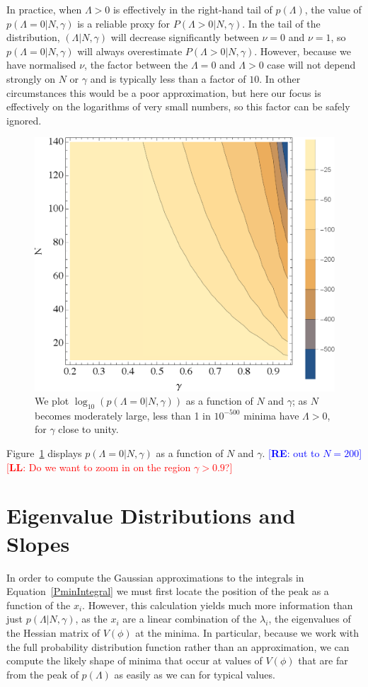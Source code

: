 \documentclass[12pt]{article}
\newcommand{\re}[1]{\textcolor{blue}{[{\bf RE}: #1]}}
\newcommand{\lfl}[1]{\textcolor{red}{[{\bf LL}: #1]}}
\begin{document}
In practice, when $\Lambda>0$ is effectively in the right-hand tail of $p(\Lambda)$,  the value of $p(\Lambda=0|N,\gamma)$ is a reliable proxy for $P(\Lambda>0|N,\gamma)$. In the tail of the distribution,  $(\Lambda|N,\gamma)$ will decrease significantly between $\nu=0$ and $\nu=1$, so $p(\Lambda=0|N,\gamma)$ will always overestimate $P(\Lambda>0|N,\gamma)$. However, because we have normalised $\nu$, the factor between the $\Lambda=0$ and $\Lambda>0$ case will not depend strongly on $N$ or $\gamma$ and is typically less than a factor of $10$. In other circumstances this would be a poor approximation, but here our focus is effectively on the logarithms of very small numbers, so this factor can be safely ignored. 

\begin{figure} 
  \centering
  \includegraphics[width=.6 \linewidth]{histo.eps}
  \caption{We plot $\log_{10}(p(\Lambda=0|N,\gamma))$ as a function of $N$ and $\gamma$; as $N$ becomes moderately large, less than 1 in $10^{-500}$ minima have $\Lambda>0$, for $\gamma$  close to unity.  }
  \label{fullcontourplot}
\end{figure}

Figure~\ref{fullcontourplot} displays  $p(\Lambda =0 |N,\gamma)$ as a function of $N$ and $\gamma$.  \re{out to $N=200$} \lfl{Do we want to zoom in on the region $\gamma > 0.9$?}


\section{Eigenvalue Distributions and Slopes} 

In order to compute the Gaussian  approximations to the integrals in Equation~\ref{PminIntegral} we must first locate the position of the peak as a function of the $x_i$. However, this calculation yields much more information than just $p(\Lambda  |N,\gamma)$, as the $x_i$ are a linear combination of the $\lambda_i$, the eigenvalues of the Hessian matrix of $V(\phi)$ at the minima. In particular, because we work with the full probability distribution function rather than an approximation, we can compute the likely shape of minima that occur at values of $V(\phi)$ that  are  far from the peak of $p(\Lambda)$ as easily as we can for typical values.  
\end{document}
